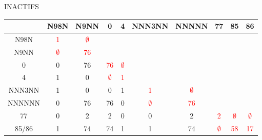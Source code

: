 \documentclass{book}
\begin{document}
\begin{center} INACTIFS \end{center}
\begin{center}
\setlength\arrayrulewidth{.5pt}
\begin{tabular}{|c|cc||cc||cc||ccc|}
\hline
	& N98N & N9NN & 0 & 4 & NNN3NN & NNNNN & 77 & 85 & 86\\
\hline
\hline
N98N & \textcolor{red}{1} &\textcolor{red}{$\emptyset$} & & & & & & & \\
N9NN &\textcolor{red}{$\emptyset$} & \textcolor{red}{76} & & & & & & & \\
\hline
\hline
0 & 0 & 76 & \textcolor{red}{76} & \textcolor{red}{$\emptyset$}& & & & & \\
4 & 1 & 0 &\textcolor{red}{$\emptyset$} & \textcolor{red}{1} & & & & &  \\
\hline
\hline
NNN3NN & 1 & 0 & 0 & 1 &\textcolor{red}{1} &\textcolor{red}{$\emptyset$} & & &  \\
\hline
NNNNNN & 0 & 76 & 76 &0 &\textcolor{red}{$\emptyset$} & \textcolor{red}{76} & & &\\
\hline
\hline
77 & 0 & 2 & 2 & 0 & 0 &2 & \textcolor{red}{2} &\textcolor{red}{$\emptyset$} &\textcolor{red}{$\emptyset$} \\
85/86 & 1 &74 & 74 & 1 & 1 & 74 &\textcolor{red}{$\emptyset$} & \textcolor{red}{58} & \textcolor{red}{17}\\
\hline
\end{tabular}
\end{center}
\end{document}
